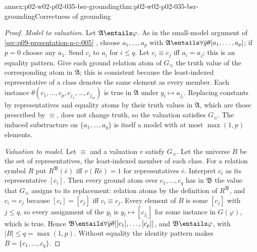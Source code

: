 \begin{annexitem}{annex:p02-w02-p02-035-bsr-grounding}{thm:p02-w02-p02-035-bsr-grounding}{Correctness of grounding}
\begin{proof}
\emph{Model to valuation.}  Let \(\mathfrak A\entails\varphi\).  As in the
small-model argument of \cref{sec:p09-presentation-n-c-005}
\cite[prop.~6.2.17]{BorgerGradelGurevich1997}, choose
\(a_1,\ldots,a_p\) with \(\mathfrak A\entails\forall\bar y\theta[a_1,\ldots,
a_p]\); if \(p=0\) choose any \(a_1\).  Send \(c_i\) to \(a_i\) for \(i\leq q\).
Let \(c_i\equiv c_j\) iff \(a_i=a_j\); this is an equality pattern.  Give each
ground relation atom of \(G_\equiv\) the truth value of the corresponding
atom in \(\mathfrak A\); this is consistent because the least-indexed
representative of a class denotes the same element as every member.  Each
instance \(\theta(c_1,\ldots,c_p,c_{j_1},\ldots,c_{j_m})\) is true in
\(\mathfrak A\) under \(y_l\mapsto a_{j_l}\).  Replacing constants by
representatives and equality atoms by their truth values in \(\mathfrak A\),
which are those prescribed by \(\equiv\), does not change truth, so the
valuation satisfies \(G_\equiv\).  The induced substructure on
\(\{a_1,\ldots,a_q\}\) is itself a model with at most \(\max(1,p)\) elements.

\emph{Valuation to model.}  Let \(\equiv\) and a valuation \(v\) satisfy
\(G_\equiv\).  Let the universe \(B\) be the set of representatives, the
least-indexed member of each class.  For a relation symbol \(R\) put
\(R^{\mathfrak B}(\bar e)\) iff \(v(R\bar e)=1\) for representatives
\(\bar e\).  Interpret \(c_i\) as its representative \([c_i]\).  Then every
ground atom over \(c_1,\ldots,c_q\) has in \(\mathfrak B\) the value that
\(G_\equiv\) assigns to its replacement: relation atoms by the definition of
\(R^{\mathfrak B}\), and \(c_i=c_j\) because \([c_i]=[c_j]\) iff
\(c_i\equiv c_j\).  Every element of \(B\) is some \([c_j]\) with \(j\leq q\),
so every assignment of the \(y_l\) is \(y_l\mapsto[c_{j_l}]\) for some
instance in \(G(\varphi)\), which is true.  Hence
\(\mathfrak B\entails\forall\bar y\theta[[c_1],\ldots,[c_p]]\), and
\(\mathfrak B\entails\varphi\), with \(\lvert B\rvert\leq q=\max(1,p)\).
Without equality the identity pattern makes \(B=\{c_1,\ldots,c_q\}\).
\end{proof}
\end{annexitem}

